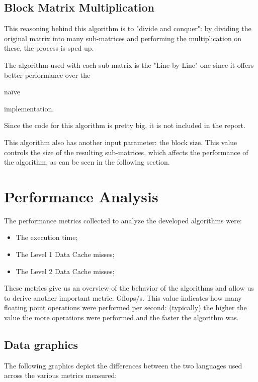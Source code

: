 \documentclass[11pt,a4paper]{article}
\begin{document}
\subsection{Block Matrix Multiplication}

This reasoning behind this algorithm is to "divide and conquer": by dividing the original matrix into many sub-matrices and performing the multiplication on these, the process is sped up.

The algorithm used with each sub-matrix is the "Line by Line" one since it offers better performance over the \begin{em}naïve\end{em} implementation.

Since the code for this algorithm is pretty big, it is not included in the report.

This algorithm also has another input parameter: the block size. This value controls the size of the resulting sub-matrices, which affects the performance of the algorithm, as can be seen in the following section.

\pagebreak

\section{Performance Analysis}

The performance metrics collected to analyze the developed algorithms were:

\begin{itemize}
    \item The execution time;
    \item The Level 1 Data Cache misses;
    \item The Level 2 Data Cache misses;
\end{itemize}

These metrics give us an overview of the behavior of the algorithms and allow us to derive another important metric: Gflops/s. This value indicates how many floating point operations were performed per second: (typically) the higher the value the more operations were performed and the faster the algorithm was.

\subsection{Data graphics}

The following graphics depict the differences between the two languages used across the various metrics measured:
\end{document}
